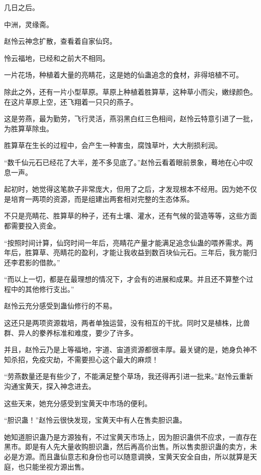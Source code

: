 
\begin{this_body}



几日之后。

中洲，灵缘斋。

赵怜云神念扩散，查看着自家仙窍。

怜云福地，已经和之前大不相同。

一片花场，种植着大量的亮睛花，这是她的仙蛊追念的食材，非得培植不可。

除此之外，还有一片小型草原。草原上种植着胜算草，这种草小而尖，嫩绿颜色。在这片草原上空，还飞翔着一只只的燕子。

这是劳燕，最为勤劳，飞行灵活，燕羽黑白红三色相间，赵怜云特意引进了一批，为胜算草除虫。

胜算草在生长的过程中，会产生一种害虫，腐蚀草叶，大大削损利润。

“数千仙元石已经花了大半，差不多见底了。”赵怜云看着眼前景象，蓦地在心中叹息一声。

起初时，她觉得这笔款子非常庞大，但用了之后，才发现根本不经用。因为她不仅是培育一两项的资源，而是组建出两套相对完整的生态体系。

不只是亮睛花、胜算草的种子，还有土壤、灌水，还有气候的营造等等，这些方面都需要投入资金。

“按照时间计算，仙窍时间一年后，亮睛花产量才能满足追念仙蛊的喂养需求。两年后，胜算草、亮睛花的盈利，才能让我收益到数百块仙元石。三年后，我方能归还李君影的借款。”

“而以上一切，都是在最理想的情况下，才会有的进展和成果。并且还不算整个过程中的其他修行支出。”

赵怜云充分感受到蛊仙修行的不易。

这还只是两项资源栽培，两者单独运营，没有相互的干扰。同时又是植株，比兽群、异人的豢养标准和难度，要少了许多。

并且，赵怜云乃是上等福地，宇道、宙道资源都很丰厚。最关键的是，她身负神不知杀招，免疫灾劫，不需要担心这个最大的麻烦！

“劳燕数量还是有些少了，不能满足整个草场，我还得再引进一批来。”赵怜云重新沟通宝黄天，探入神念进去。

这些天来，她充分感受到宝黄天中市场的便利。

“胆识蛊！”赵怜云很快发现，宝黄天中有人在售卖胆识蛊。

她知道胆识蛊乃是方源独有，不过宝黄天市场上，因为胆识蛊供不应求，一直存在黑市。即是有人先大量收购胆识蛊，然后再高价出售。所以售卖胆识蛊的卖方，未必是方源。而且蛊仙意志和身份也可以随意调换，宝黄天安全自由，所以就算是天庭，也只能坐视方源出售。


\end{this_body}
